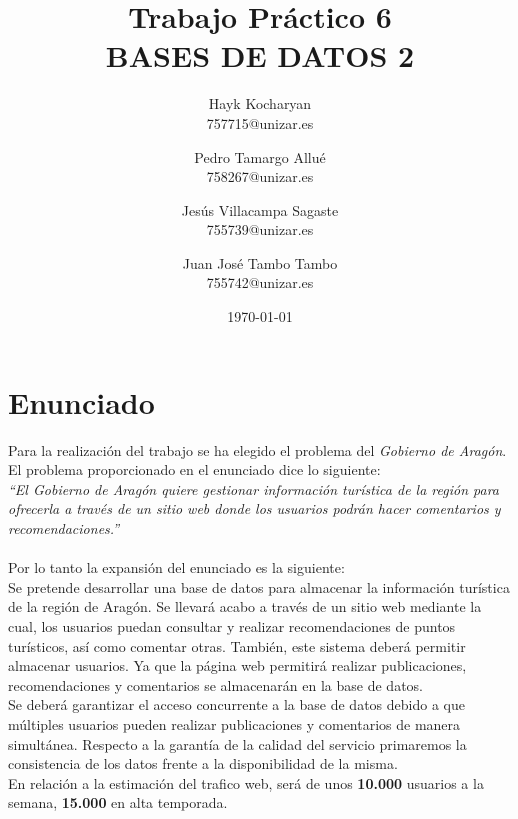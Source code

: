 \documentclass[3pt]{article}
\begin{document}
\begin{titlepage}
\title{{\Huge \textbf{
	Trabajo Práctico 6 \\
 	BASES DE DATOS 2
 		}}}
\author{
  Hayk Kocharyan\\
  757715@unizar.es
  \and
  Pedro Tamargo Allué\\
  758267@unizar.es
  \and
  Jesús Villacampa Sagaste\\
  755739@unizar.es
  \and
  Juan José Tambo Tambo\\
  755742@unizar.es
}

\date{\today}
\clearpage\maketitle
\thispagestyle{empty}

\end{titlepage}

\tableofcontents

\newpage 

\section{Enunciado}
Para la realización del trabajo se ha elegido el problema del \emph{Gobierno de Aragón}. El problema proporcionado en el enunciado dice lo siguiente:\\

\emph{``El Gobierno de Aragón quiere gestionar información turística de la región para ofrecerla a través de un sitio web donde los usuarios podrán hacer comentarios y recomendaciones.''}
\\\\
Por lo tanto la expansión del enunciado es la siguiente:\\

Se pretende desarrollar una base de datos para almacenar la información turística de la región de Aragón. Se llevará acabo a través de un sitio web mediante la cual, los usuarios puedan consultar y realizar recomendaciones  de puntos turísticos, así como comentar otras. También, este sistema deberá permitir almacenar usuarios. Ya que  la página web permitirá realizar publicaciones, recomendaciones y comentarios se almacenarán en la base de datos.\\
Se deberá garantizar el acceso concurrente a la base de datos debido a que múltiples usuarios pueden realizar publicaciones y comentarios de manera simultánea.
Respecto a la garantía de la calidad del servicio primaremos la consistencia de los datos frente a la disponibilidad de la misma.\\
En relación a la  estimación del trafico web, será de unos \textbf{10.000} usuarios a la semana, \textbf{15.000} en alta temporada.\\
\end{document}
